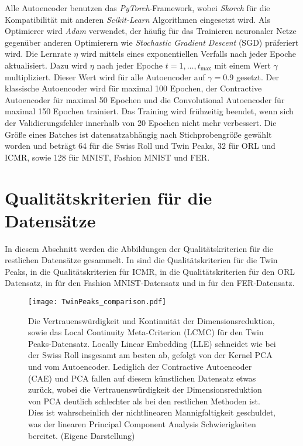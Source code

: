 Alle Autoencoder benutzen das \textit{PyTorch}-Framework, wobei \textit{Skorch} für die
Kompatibilität mit anderen \textit{Scikit-Learn} Algorithmen eingesetzt wird. Als Optimierer wird
\textit{Adam} verwendet, der häufig für das Trainieren neuronaler Netze gegenüber anderen
Optimierern wie \textit{Stochastic Gradient Descent} (SGD) präferiert wird. Die Lernrate $\eta$
wird mittels eines exponentiellen Verfalls nach jeder Epoche aktualisiert. Dazu wird $\eta$ nach
jeder Epoche $t = 1, \ldots, t_{\text{max}}$ mit einem Wert $\gamma$ multipliziert. Dieser Wert
wird für alle Autoencoder auf $\gamma = \num{0,9}$ gesetzt. Der klassische Autoencoder wird für
maximal 100 Epochen, der Contractive Autoencoder für maximal 50 Epochen und die Convolutional
Autoencoder für maximal 150 Epochen trainiert. Das Training wird frühzeitig beendet, wenn sich der
Validierungsfehler innerhalb von 20 Epochen nicht mehr verbessert. Die Größe eines Batches ist
datensatzabhängig nach Stichprobengröße gewählt worden und beträgt 64 für die Swiss Roll und Twin
Peaks, 32 für ORL und ICMR, sowie 128 für MNIST, Fashion MNIST und FER.

\section{Qualitätskriterien für die Datensätze}
\label{ch:Appendix:Qualitaetskriterien}

In diesem Abschnitt werden die Abbildungen der Qualitätskriterien für die restlichen Datensätze
gesammelt. In  sind die Qualitätskriterien für die Twin Peaks, in
 die Qualitätskriterien für ICMR, in  die
Qualitätskriterien für den ORL Datensatz, in  für den Fashion
MNIST-Datensatz und in  für den FER-Datensatz.
\begin{figure}[ht]
	\begin{center}
		\texttt{[image: TwinPeaks\_comparison.pdf]}
	\end{center}
	\caption[Qualitätskriterien für den Twin Peaks-Datensatz]{Die Vertrauenswürdigkeit und Kontinuität der Dimensionsreduktion, sowie das Local Continuity Meta-Criterion (LCMC) für den Twin Peaks-Datensatz. Locally Linear Embedding (LLE) schneidet wie bei der Swiss Roll insgesamt am besten ab, gefolgt von der Kernel PCA und vom Autoencoder. Lediglich der Contractive Autoencoder (CAE) und PCA fallen auf diesem künstlichen Datensatz etwas zurück, wobei die Vertrauenswürdigkeit der Dimensionsreduktion von PCA deutlich schlechter als bei den restlichen Methoden ist. Dies ist wahrscheinlich der nichtlinearen Mannigfaltigkeit geschuldet, was der linearen Principal Component Analysis Schwierigkeiten bereitet. (Eigene Darstellung)}
	\label{fig:TwinPeaksMetrics}
\end{figure}


